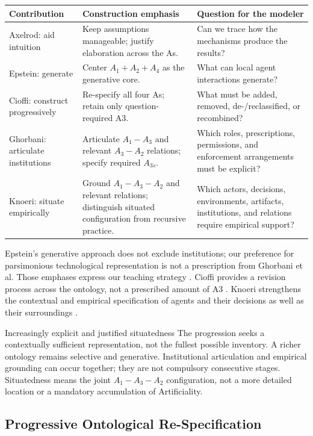 \documentclass[11pt,a4paper]{article}
\begin{document}
\renewcommand{\arraystretch}{1.2}
\noindent\begin{tabularx}{\linewidth}{@{}P{3.1cm}YY@{}}
\toprule
\textbf{Contribution} & \textbf{Construction emphasis} & \textbf{Question for the modeler}\\\midrule
Axelrod: aid intuition & Keep assumptions manageable; justify elaboration across the As. & Can we trace how the mechanisms produce the results?\\
Epstein: generate & Center $A_1+A_2+A_4$ as the generative core. & What can local agent interactions generate?\\
Cioffi: construct progressively & Re-specify all four As; retain only question-required A3. & What must be added, removed, de-/reclassified, or recombined?\\
Ghorbani: articulate institutions & Articulate $A_1-A_3$ and relevant $A_3-A_2$ relations; specify required $A_{3s}$. & Which roles, prescriptions, permissions, and enforcement arrangements must be explicit?\\
Knoeri: situate empirically & Ground $A_1-A_3-A_2$ and relevant relations; distinguish situated configuration from recursive practice. & Which actors, decisions, environments, artifacts, institutions, and relations require empirical support?\\\bottomrule
\end{tabularx}

Epstein's generative approach does not exclude institutions; our preference for parsimonious technological representation is not a prescription from Ghorbani et al. Those emphases express our teaching strategy \cite{epstein,ghorbani}. Cioffi provides a revision process across the ontology, not a prescribed amount of A3 \cite{cioffi}. Knoeri strengthens the contextual and empirical specification of agents and their decisions as well as their surroundings \cite{knoeri}.

\begin{principle}{Increasingly explicit and justified situatedness}
The progression seeks a contextually sufficient representation, not the fullest possible inventory. A richer ontology remains selective and generative. Institutional articulation and empirical grounding can occur together; they are not compulsory consecutive stages. Situatedness means the joint $A_1-A_3-A_2$ configuration, not a more detailed location or a mandatory accumulation of Artificiality.
\end{principle}

\subsection{Progressive Ontological Re-Specification}
\end{document}

